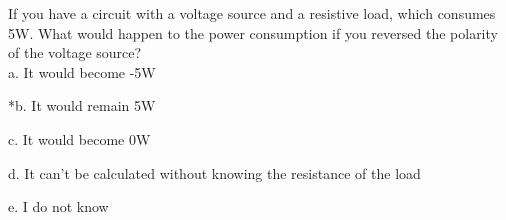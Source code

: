 
If you have a circuit with a voltage source and a resistive load, which consumes 5W. What would happen to the power consumption if you reversed the polarity of the voltage source? \\

a. It would become -5W

*b. It would remain 5W

c. It would become 0W

d. It can't be calculated without knowing the resistance of the load

e. I do not know \\
